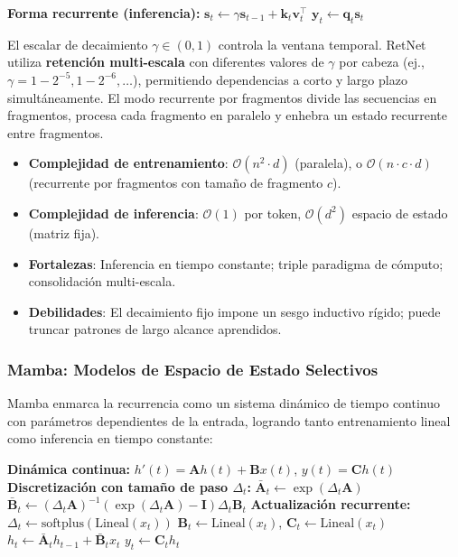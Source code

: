 \begin{algorithmic}[1]
\State \textbf{Forma recurrente (inferencia):}
    \State $\mathbf{s}_t \gets \gamma \mathbf{s}_{t-1} + \mathbf{k}_t \mathbf{v}_t^\top$ 
    \State $\mathbf{y}_t \gets \mathbf{q}_t \mathbf{s}_t$ 
\EndFor
\end{algorithmic}

El escalar de decaimiento $\gamma \in (0,1)$ controla la ventana temporal. RetNet utiliza \textbf{retención multi-escala} con diferentes valores de $\gamma$ por cabeza (ej., $\gamma = 1 - 2^{-5}, 1 - 2^{-6}, \ldots$), permitiendo dependencias a corto y largo plazo simultáneamente. El modo recurrente por fragmentos divide las secuencias en fragmentos, procesa cada fragmento en paralelo y enhebra un estado recurrente entre fragmentos.

\begin{itemize}[leftmargin=*]
    \item \textbf{Complejidad de entrenamiento}: $\mathcal{O}(n^2 \cdot d)$ (paralela), o $\mathcal{O}(n \cdot c \cdot d)$ (recurrente por fragmentos con tamaño de fragmento $c$).
    \item \textbf{Complejidad de inferencia}: $\mathcal{O}(1)$ por token, $\mathcal{O}(d^2)$ espacio de estado (matriz fija).
    \item \textbf{Fortalezas}: Inferencia en tiempo constante; triple paradigma de cómputo; consolidación multi-escala.
    \item \textbf{Debilidades}: El decaimiento fijo impone un sesgo inductivo rígido; puede truncar patrones de largo alcance aprendidos.
\end{itemize}

\subsubsection{Mamba: Modelos de Espacio de Estado Selectivos}
Mamba \citep{gu_mamba_2023} enmarca la recurrencia como un sistema dinámico de tiempo continuo con parámetros dependientes de la entrada, logrando tanto entrenamiento lineal como inferencia en tiempo constante:

\begin{algorithmic}[1]
\State \textbf{Dinámica continua:} $h'(t) = \mathbf{A} h(t) + \mathbf{B} x(t)$, \quad $y(t) = \mathbf{C} h(t)$
\State \textbf{Discretización con tamaño de paso $\Delta_t$:}
\State $\bar{\mathbf{A}}_t \gets \exp(\Delta_t \mathbf{A})$
\State $\bar{\mathbf{B}}_t \gets (\Delta_t \mathbf{A})^{-1} (\exp(\Delta_t \mathbf{A}) - \mathbf{I}) \Delta_t \mathbf{B}_t$
\State \textbf{Actualización recurrente:}
    \State $\Delta_t \gets \text{softplus}(\text{Lineal}(x_t))$ 
    \State $\mathbf{B}_t \gets \text{Lineal}(x_t)$, \quad $\mathbf{C}_t \gets \text{Lineal}(x_t)$ 
    \State $h_t \gets \bar{\mathbf{A}}_t h_{t-1} + \bar{\mathbf{B}}_t x_t$ 
    \State $y_t \gets \mathbf{C}_t h_t$ 
\EndFor
\end{algorithmic}

